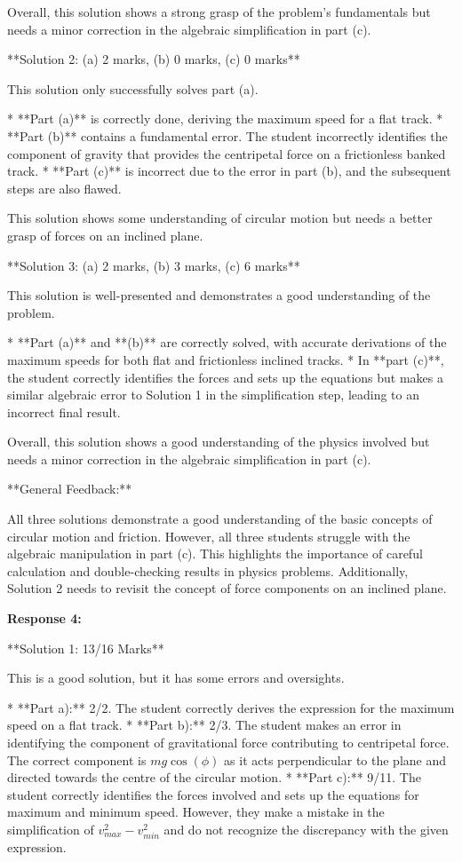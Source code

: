 \documentclass[a4paper,11pt]{article}
\begin{document}
Overall, this solution shows a strong grasp of the problem's fundamentals but needs a minor correction in the algebraic simplification in part (c).

**Solution 2: (a) 2 marks, (b) 0 marks, (c) 0 marks**

This solution only successfully solves part (a).

*   **Part (a)** is correctly done, deriving the maximum speed for a flat track.
*   **Part (b)** contains a fundamental error. The student incorrectly identifies the component of gravity that provides the centripetal force on a frictionless banked track.
*   **Part (c)** is incorrect due to the error in part (b), and the subsequent steps are also flawed.

This solution shows some understanding of circular motion but needs a better grasp of forces on an inclined plane.

**Solution 3: (a) 2 marks, (b) 3 marks, (c) 6 marks**

This solution is well-presented and demonstrates a good understanding of the problem.

*   **Part (a)** and **(b)** are correctly solved, with accurate derivations of the maximum speeds for both flat and frictionless inclined tracks.
*   In **part (c)**, the student correctly identifies the forces and sets up the equations but makes a similar algebraic error to Solution 1 in the simplification step, leading to an incorrect final result.

Overall, this solution shows a good understanding of the physics involved but needs a minor correction in the algebraic simplification in part (c).

**General Feedback:**

All three solutions demonstrate a good understanding of the basic concepts of circular motion and friction. However, all three students struggle with the algebraic manipulation in part (c). This highlights the importance of careful calculation and double-checking results in physics problems. Additionally, Solution 2 needs to revisit the concept of force components on an inclined plane.

\textbf{Response 4:}

**Solution 1: 13/16 Marks**

This is a good solution, but it has some errors and oversights.

*   **Part a):** 2/2. The student correctly derives the expression for the maximum speed on a flat track.
*   **Part b):** 2/3. The student makes an error in identifying the component of gravitational force contributing to centripetal force. The correct component is \(mg \cos(\phi)\) as it acts perpendicular to the plane and directed towards the centre of the circular motion.
*   **Part c):** 9/11. The student correctly identifies the forces involved and sets up the equations for maximum and minimum speed. However, they make a mistake in the simplification of \(v^2_{max} - v^2_{min}\) and do not recognize the discrepancy with the given expression.
\end{document}

